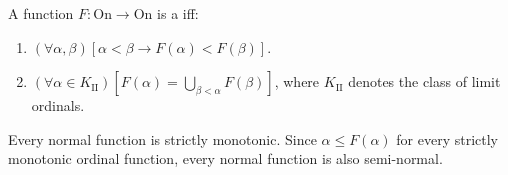 A function $F: \mathrm{On} \to \mathrm{On}$ is a  iff:
\begin{enumerate}
\item $(\forall \alpha, \beta)[\alpha < \beta \to F(\alpha) < F(\beta)]$.
\item $(\forall \alpha \in K_{\mathrm{II}})\left[F(\alpha) = \bigcup_{\beta < \alpha} F(\beta)\right]$, where $K_{\mathrm{II}}$ denotes the class of limit ordinals.
\end{enumerate}
Every normal function is strictly monotonic. Since $\alpha \leq F(\alpha)$ for every strictly monotonic ordinal function, every normal function is also semi-normal.
